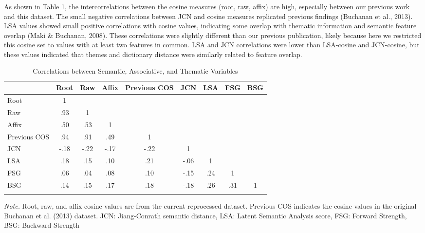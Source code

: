 \documentclass[english,,man]{apa6}
\theoremstyle{definition}
\theoremstyle{definition}
\theoremstyle{definition}
\theoremstyle{remark}
\begin{document}
As shown in Table \ref{tab:correlation-table}, the intercorrelations
between the cosine measures (root, raw, affix) are high, especially
between our previous work and this dataset. The small negative
correlations between JCN and cosine measures replicated previous
findings (Buchanan et al., 2013). LSA values showed small positive
correlations with cosine values, indicating some overlap with thematic
information and semantic feature overlap (Maki \& Buchanan, 2008). These
correlations were slightly different than our previous publication,
likely because here we restricted this cosine set to values with at
least two features in common. LSA and JCN correlations were lower than
LSA-cosine and JCN-cosine, but these values indicated that themes and
dictionary distance were similarly related to feature overlap.

\begin{table}[tbp]
\begin{center}
\begin{threeparttable}
\caption{\label{tab:correlation-table}Correlations between Semantic, Associative, and Thematic Variables}
\begin{tabular}{lcccccccc}
\toprule
  & Root & Raw & Affix & Previous COS & JCN & LSA & FSG & BSG\\
\midrule
Root & 1 &  &  &  &  &  &  & \\
Raw & .93 & 1 &  &  &  &  &  & \\
Affix & .50 & .53 & 1 &  &  &  &  & \\
Previous COS & .94 & .91 & .49 & 1 &  &  &  & \\
JCN & -.18 & -.22 & -.17 & -.22 & 1 &  &  & \\
LSA & .18 & .15 & .10 & .21 & -.06 & 1 &  & \\
FSG & .06 & .04 & .08 & .10 & -.15 & .24 & 1 & \\
BSG & .14 & .15 & .17 & .18 & -.18 & .26 & .31 & 1\\
\bottomrule
\addlinespace
\end{tabular}
\begin{tablenotes}[para]
\normalsize{\textit{Note.} Root, raw, and affix cosine values are from the current reprocessed dataset. Previous COS indicates the cosine values in the original Buchanan et al. (2013) dataset. JCN: Jiang-Conrath semantic distance, LSA: Latent Semantic Analysis score, FSG: Forward Strength, BSG: Backward Strength}
\end{tablenotes}
\end{threeparttable}
\end{center}
\end{table}
\end{document}
